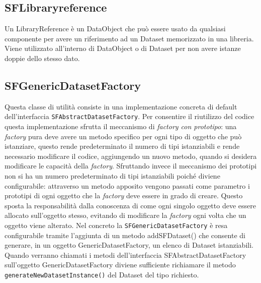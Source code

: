 \subsection{SFLibraryreference}
\label{sub:sflibraryreference}
Un LibraryReference \`e un DataObject che pu\`o essere usato da qualsiasi componente per avere un riferimento ad un Dataset memorizzato in una libreria. Viene utilizzato all'interno di DataObject o di Dataset per non avere istanze doppie dello stesso dato.

\subsection{SFGenericDatasetFactory}
\label{sub:sfgenericdatasetfactory}
Questa classe di utilit\`a consiste in una implementazione concreta di default dell'interfaccia \texttt{SFAbstractDatasetFactory}.
Per consentire il riutilizzo del codice questa implementazione sfrutta il meccanismo di \textit{factory con prototipo}: una \textit{factory} pura deve avere un metodo specifico per ogni tipo di oggetto che pu\`o istanziare, questo rende predeterminato il numero di tipi istanziabili e rende necessario modificare il codice, aggiungendo un nuovo metodo, quando si desidera modificare le capacit\`a della \textit{factory}.
Sfruttando invece il meccanismo dei prototipi non si ha un numero predeterminato di tipi istanziabili poich\'e diviene configurabile: attraverso un metodo apposito vengono passati come parametro i prototipi di ogni oggetto che la \textit{factory} deve essere in grado di creare.
Questo sposta la responsabilit\`a dalla conoscenza di come ogni singolo oggetto deve essere allocato sull'oggetto stesso, evitando di modificare la \textit{factory} ogni volta che un oggetto viene alterato.
Nel concreto la \texttt{SFGenericDatasetFactory} \`e resa configurabile tramite l'aggiunta di un metodo addSFDataset() che consente di generare, in un oggetto GenericDatasetFactory, un elenco di Dataset istanziabili.
Quando verranno chiamati i metodi dell'interfaccia SFAbstractDatasetFactory sull'oggetto GenericDatasetFactory diviene sufficiente richiamare il metodo \texttt{generateNewDatasetInstance()} del Dataset del tipo richiesto.